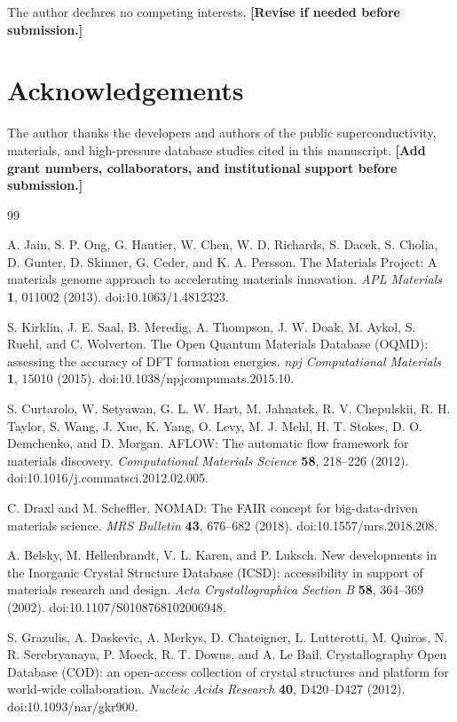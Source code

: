 \documentclass[11pt,a4paper]{article}
\begin{document}
The author declares no competing interests. \textbf{[Revise if needed before submission.]}

\section*{Acknowledgements}

The author thanks the developers and authors of the public superconductivity, materials, and high-pressure database studies cited in this manuscript. \textbf{[Add grant numbers, collaborators, and institutional support before submission.]}

\begin{thebibliography}{99}

A. Jain, S. P. Ong, G. Hautier, W. Chen, W. D. Richards, S. Dacek, S. Cholia, D. Gunter, D. Skinner, G. Ceder, and K. A. Persson.
The Materials Project: A materials genome approach to accelerating materials innovation.
\textit{APL Materials} \textbf{1}, 011002 (2013).
doi:10.1063/1.4812323.

S. Kirklin, J. E. Saal, B. Meredig, A. Thompson, J. W. Doak, M. Aykol, S. Ruehl, and C. Wolverton.
The Open Quantum Materials Database (OQMD): assessing the accuracy of DFT formation energies.
\textit{npj Computational Materials} \textbf{1}, 15010 (2015).
doi:10.1038/npjcompumats.2015.10.

S. Curtarolo, W. Setyawan, G. L. W. Hart, M. Jahnatek, R. V. Chepulskii, R. H. Taylor, S. Wang, J. Xue, K. Yang, O. Levy, M. J. Mehl, H. T. Stokes, D. O. Demchenko, and D. Morgan.
AFLOW: The automatic flow framework for materials discovery.
\textit{Computational Materials Science} \textbf{58}, 218--226 (2012).
doi:10.1016/j.commatsci.2012.02.005.

C. Draxl and M. Scheffler.
NOMAD: The FAIR concept for big-data-driven materials science.
\textit{MRS Bulletin} \textbf{43}, 676--682 (2018).
doi:10.1557/mrs.2018.208.

A. Belsky, M. Hellenbrandt, V. L. Karen, and P. Luksch.
New developments in the Inorganic Crystal Structure Database (ICSD): accessibility in support of materials research and design.
\textit{Acta Crystallographica Section B} \textbf{58}, 364--369 (2002).
doi:10.1107/S0108768102006948.

S. Grazulis, A. Daskevic, A. Merkys, D. Chateigner, L. Lutterotti, M. Quiros, N. R. Serebryanaya, P. Moeck, R. T. Downs, and A. Le Bail.
Crystallography Open Database (COD): an open-access collection of crystal structures and platform for world-wide collaboration.
\textit{Nucleic Acids Research} \textbf{40}, D420--D427 (2012).
doi:10.1093/nar/gkr900.


\end{thebibliography}
\end{document}
